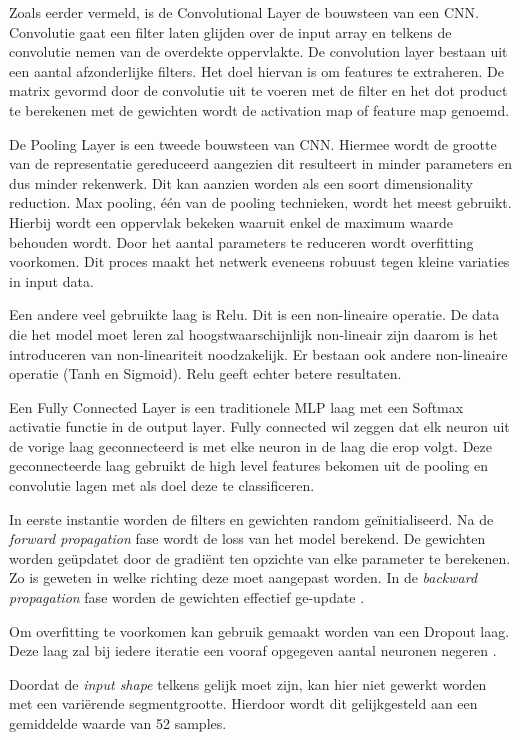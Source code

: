 Zoals eerder vermeld, is de Convolutional Layer de bouwsteen van een CNN. Convolutie gaat een filter laten glijden over de input array en telkens de convolutie nemen van de overdekte oppervlakte. De convolution layer bestaan uit een aantal afzonderlijke filters.
Het doel hiervan is om features te extraheren. De matrix gevormd door de convolutie uit te voeren met de filter en het dot product te berekenen met de gewichten wordt de activation map of feature map genoemd.

De Pooling Layer is een tweede bouwsteen van CNN. Hiermee wordt de grootte van de representatie gereduceerd aangezien dit resulteert in minder parameters en dus minder rekenwerk. Dit kan aanzien worden als een soort dimensionality reduction. Max pooling, één van de pooling technieken, wordt het meest gebruikt. Hierbij wordt een oppervlak bekeken waaruit enkel de maximum waarde behouden wordt. Door het aantal parameters te reduceren wordt overfitting voorkomen. Dit proces maakt het netwerk eveneens robuust tegen kleine variaties in input data.

Een andere veel gebruikte laag is Relu. Dit is een non-lineaire operatie. De data die het model moet leren zal hoogstwaarschijnlijk non-lineair zijn daarom is het introduceren van non-lineariteit noodzakelijk. Er bestaan ook andere non-lineaire operatie (Tanh en Sigmoid). Relu geeft echter betere resultaten.

Een Fully Connected Layer is een traditionele MLP laag met een Softmax activatie functie in de output layer. Fully connected wil zeggen dat elk neuron uit de vorige laag geconnecteerd is met elke neuron in de laag die erop volgt.
Deze geconnecteerde laag gebruikt de high level features bekomen uit de pooling en convolutie lagen met als doel deze te classificeren. 

In eerste instantie worden de filters en gewichten random geïnitialiseerd. Na de \textit{forward propagation} fase wordt de loss van het model berekend. De gewichten worden geüpdatet door de gradiënt ten opzichte van elke parameter te berekenen. Zo is geweten in welke richting deze moet aangepast worden. In de \textit{backward propagation} fase worden de gewichten effectief ge-update \cite{ref47} \cite{ref48}.

Om overfitting te voorkomen kan gebruik gemaakt worden van een Dropout laag. Deze laag zal bij iedere iteratie een vooraf opgegeven aantal neuronen negeren \cite{ref49}.

Doordat de \textit{input shape} telkens gelijk moet zijn, kan hier niet gewerkt worden met een variërende segmentgrootte. Hierdoor wordt dit gelijkgesteld aan een gemiddelde waarde van 52 samples.

